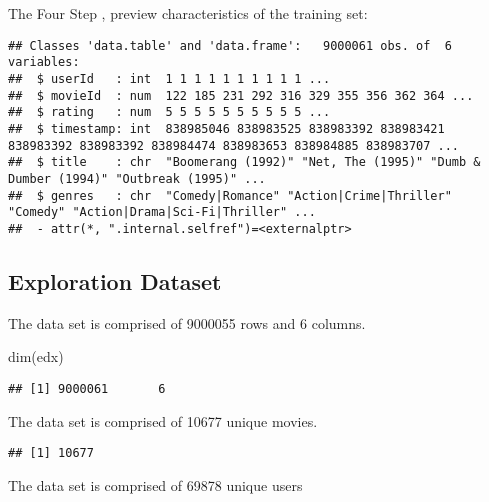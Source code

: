\documentclass[
]{article}
\newenvironment{Shaded}{\begin{snugshade}}{\end{snugshade}}
\newcommand{\FunctionTok}[1]{\textcolor[rgb]{0.00,0.00,0.00}{#1}}
\newcommand{\NormalTok}[1]{#1}
\newcommand{\SpecialCharTok}[1]{\textcolor[rgb]{0.00,0.00,0.00}{#1}}
\begin{document}
The Four Step , preview characteristics of the training set:

\begin{verbatim}
## Classes 'data.table' and 'data.frame':   9000061 obs. of  6 variables:
##  $ userId   : int  1 1 1 1 1 1 1 1 1 1 ...
##  $ movieId  : num  122 185 231 292 316 329 355 356 362 364 ...
##  $ rating   : num  5 5 5 5 5 5 5 5 5 5 ...
##  $ timestamp: int  838985046 838983525 838983392 838983421 838983392 838983392 838984474 838983653 838984885 838983707 ...
##  $ title    : chr  "Boomerang (1992)" "Net, The (1995)" "Dumb & Dumber (1994)" "Outbreak (1995)" ...
##  $ genres   : chr  "Comedy|Romance" "Action|Crime|Thriller" "Comedy" "Action|Drama|Sci-Fi|Thriller" ...
##  - attr(*, ".internal.selfref")=<externalptr>
\end{verbatim}

\hypertarget{exploration-dataset}{%
\subsection{Exploration Dataset}\label{exploration-dataset}}

The data set is comprised of 9000055 rows and 6 columns.

\begin{Shaded}
\begin{Highlighting}[]
\FunctionTok{dim}\NormalTok{(edx)}
\end{Highlighting}
\end{Shaded}

\begin{verbatim}
## [1] 9000061       6
\end{verbatim}

The data set is comprised of 10677 unique movies.

\begin{Shaded}
\end{Shaded}

\begin{verbatim}
## [1] 10677
\end{verbatim}

The data set is comprised of 69878 unique users

\begin{Shaded}
\end{Shaded}
\end{document}
